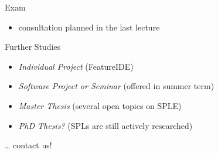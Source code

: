 \begin{frame}[b]{\myframetitle}
\begin{mycolumns}[b]
\begin{definition}{Exam}
\begin{itemize}
				\item consultation planned in the last lecture
			\end{itemize}
		\end{definition}
		\begin{example}{Further Studies}
			\begin{itemize}
				\item \emph{Individual Project} (FeatureIDE)
				\item \emph{Software Project or Seminar} (offered in summer term) %
				\item \emph{Master Thesis} (several open topics on SPLE)
				\item \emph{PhD Thesis?} (SPLs are still actively researched)
			\end{itemize}
			\ldots{} contact us!
		\end{example}
	\end{mycolumns}
\end{frame}
